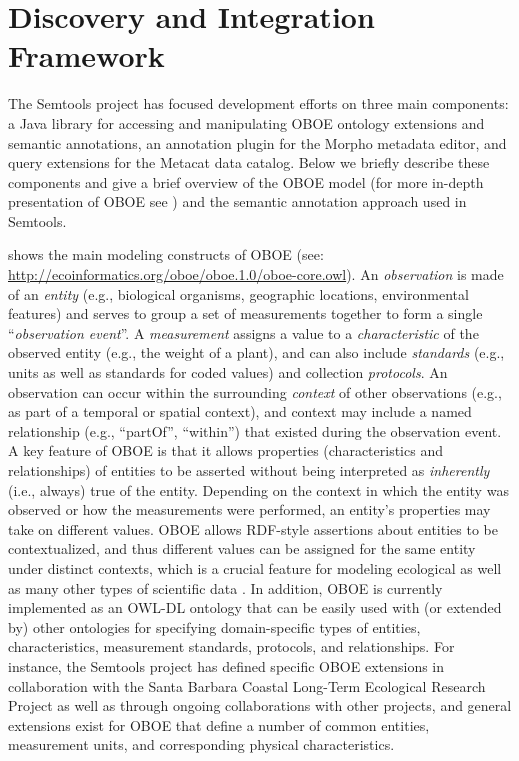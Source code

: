 \section{Discovery and Integration Framework}
\label{sec:framework}

The Semtools project has focused development efforts on three main
components: a Java library for accessing and manipulating OBOE
ontology extensions and semantic annotations, an annotation plugin for
the Morpho metadata editor, and query extensions for the Metacat data
catalog. Below we briefly describe these components and give a brief
overview of the OBOE model (for more in-depth presentation of OBOE see
\cite{madin07:_ontol_for_descr_and_synth,bowers08}) and the semantic
annotation approach used in Semtools.


   shows the
main modeling constructs of OBOE (see:
\url{http://ecoinformatics.org/oboe/oboe.1.0/oboe-core.owl}). An {\em
  observation} is made of an {\em entity} (e.g., biological organisms,
geographic locations, environmental features) and serves to group a
set of measurements together to form a single ``\emph{observation
  event}''. A \emph{measurement} assigns a value to a {\em
  characteristic} of the observed entity (e.g., the weight of a
plant), and can also include \emph{standards} (e.g., units as well as
standards for coded values) and collection \emph{protocols}. An
observation can occur within the surrounding \emph{context} of other
observations (e.g., as part of a temporal or spatial context), and
context may include a named relationship (e.g., ``partOf'',
``within'') that existed during the observation event. A key feature
of OBOE is that it allows properties (characteristics and
relationships) of entities to be asserted without being interpreted as
\emph{inherently} (i.e., {always}) true of the entity.  Depending on
the context in which the entity was observed or how the measurements
were performed, an entity's properties may take on different values.
OBOE allows RDF-style assertions about entities to be contextualized,
and thus different values can be assigned for the same entity under
distinct contexts, which is a crucial feature for modeling ecological
as well as many other types of scientific data
\cite{bowers08,mungall07:_repres_phenot_in_owl}. In addition, OBOE is
currently implemented as an OWL-DL ontology that can be easily used
with (or extended by) other ontologies for specifying domain-specific
types of entities, characteristics, measurement standards, protocols,
and relationships. For instance, the Semtools project has defined
specific OBOE extensions in collaboration with the Santa Barbara
Coastal Long-Term Ecological Research Project as well as through
ongoing collaborations with other projects, and general extensions
exist for OBOE that define a number of common entities, measurement
units, and corresponding physical characteristics.

